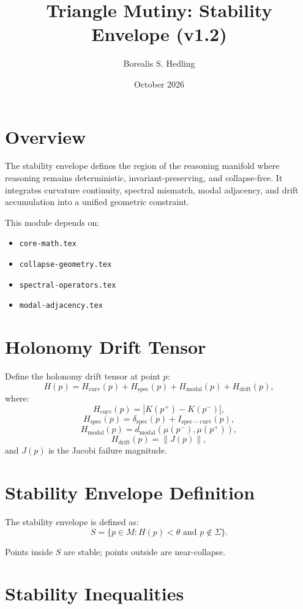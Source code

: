 \documentclass[11pt]{article}
\title{Triangle Mutiny: Stability Envelope (v1.2)}
\author{Borealis S. Hedling}
\date{October 2026}
\begin{document}
\maketitle

\section{Overview}

The stability envelope defines the region of the reasoning manifold where
reasoning remains deterministic, invariant-preserving, and collapse-free.
It integrates curvature continuity, spectral mismatch, modal adjacency,
and drift accumulation into a unified geometric constraint.

This module depends on:
\begin{itemize}
  \item \texttt{core-math.tex}
  \item \texttt{collapse-geometry.tex}
  \item \texttt{spectral-operators.tex}
  \item \texttt{modal-adjacency.tex}
\end{itemize}

\section{Holonomy Drift Tensor}

Define the holonomy drift tensor at point $p$:
\[
H(p)
  = H_{\mathrm{curv}}(p)
  + H_{\mathrm{spec}}(p)
  + H_{\mathrm{modal}}(p)
  + H_{\mathrm{drift}}(p),
\]
where:
\[
H_{\mathrm{curv}}(p) = |K(p^+) - K(p^-)|,
\]
\[
H_{\mathrm{spec}}(p)
  = \delta_{\mathrm{spec}}(p)
    + I_{\mathrm{spec-curv}}(p),
\]
\[
H_{\mathrm{modal}}(p)
  = d_{\mathrm{modal}}(\mu(p^-), \mu(p^+)),
\]
\[
H_{\mathrm{drift}}(p)
  = \|J(p)\|,
\]
and $J(p)$ is the Jacobi failure magnitude.

\section{Stability Envelope Definition}

The stability envelope is defined as:
\[
S = \{ p \in M : H(p) < \theta \text{ and } p \notin \Sigma \}.
\]

Points inside $S$ are stable; points outside are near-collapse.

\section{Stability Inequalities}
\end{document}
